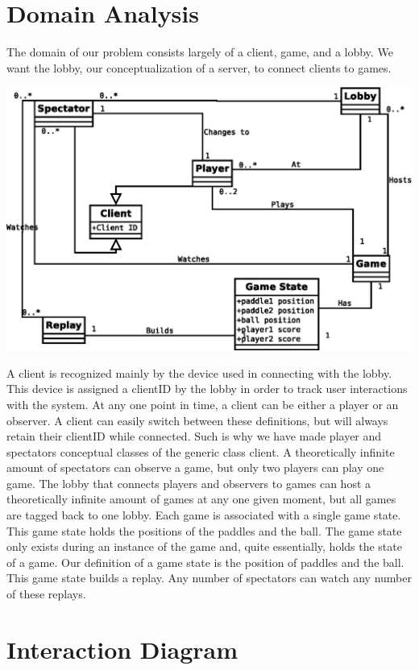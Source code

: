 \documentclass[letterpaper,12pt]{article}
\begin{document}
\section{Domain Analysis}
The domain of our problem consists largely of a client, game, and a lobby. We want the lobby, our conceptualization of a server, to connect clients to games.\\
\begin{center}\includegraphics{DomAnaUML.eps} \end{center} 
A client is recognized mainly by the device used in connecting with the lobby. This device is assigned a clientID by the lobby in order to track user interactions with the system. At any one point in time, a client can be either a player or an observer. A client can easily switch between these definitions, but will always retain their clientID while connected. Such is why we have made player and spectators conceptual classes of the generic class client. A theoretically infinite amount of spectators can observe a game, but only two players can play one game. The lobby that connects players and observers to games can host a theoretically infinite amount of games at any one given moment, but all games are tagged back to one lobby. Each game is associated with a single game state. This game state holds the positions of the paddles and the ball. The game state only exists during an instance of the game and, quite essentially, holds the state of a game. Our definition of a game state is the position of paddles and the ball. This game state builds a replay. Any number of spectators can watch any number of these replays. 

\section{Interaction Diagram}
\end{document}
